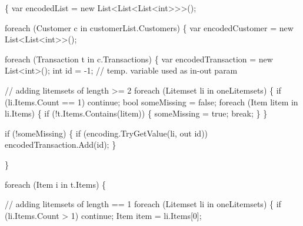 \begin{DoxyCode}
                                                    \{
            var encodedList = \textcolor{keyword}{new} List<List<List<int>>>();

            \textcolor{keywordflow}{foreach} (Customer c \textcolor{keywordflow}{in} customerList.Customers) \{
                var encodedCustomer = \textcolor{keyword}{new} List<List<int>>();

                \textcolor{keywordflow}{foreach} (Transaction t \textcolor{keywordflow}{in} c.Transactions) \{
                    var encodedTransaction = \textcolor{keyword}{new} List<int>();
                    \textcolor{keywordtype}{int} \textcolor{keywordtype}{id} = -1; \textcolor{comment}{// temp. variable used as in-out param}

                    \textcolor{comment}{// adding litemsets of length >= 2}
                    \textcolor{keywordflow}{foreach} (Litemset li \textcolor{keywordflow}{in} oneLitemsets) \{
                        \textcolor{keywordflow}{if} (li.Items.Count == 1)
                            \textcolor{keywordflow}{continue};
                        \textcolor{keywordtype}{bool} someMissing = \textcolor{keyword}{false};
                        \textcolor{keywordflow}{foreach} (Item litem \textcolor{keywordflow}{in} li.Items) \{
                            \textcolor{keywordflow}{if} (!t.Items.Contains(litem)) \{
                                someMissing = \textcolor{keyword}{true};
                                \textcolor{keywordflow}{break};
                            \}
                        \}

                        \textcolor{keywordflow}{if} (!someMissing) \{
                            \textcolor{keywordflow}{if} (encoding.TryGetValue(li, out \textcolor{keywordtype}{id}))
                                encodedTransaction.Add(\textcolor{keywordtype}{id});
                        \}

                    \}

                    \textcolor{keywordflow}{foreach} (Item i \textcolor{keywordflow}{in} t.Items) \{

                        \textcolor{comment}{// adding litemsets of length == 1}
                        \textcolor{keywordflow}{foreach} (Litemset li \textcolor{keywordflow}{in} oneLitemsets) \{
                            \textcolor{keywordflow}{if} (li.Items.Count > 1)
                                \textcolor{keywordflow}{continue};
                            Item item = li.Items[0];


\end{DoxyCode}
